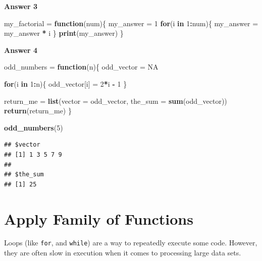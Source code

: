 \documentclass[
]{book}
\newenvironment{Shaded}{\begin{snugshade}}{\end{snugshade}}
\newcommand{\ControlFlowTok}[1]{\textcolor[rgb]{0.13,0.29,0.53}{\textbf{#1}}}
\newcommand{\DataTypeTok}[1]{\textcolor[rgb]{0.13,0.29,0.53}{#1}}
\newcommand{\DecValTok}[1]{\textcolor[rgb]{0.00,0.00,0.81}{#1}}
\newcommand{\KeywordTok}[1]{\textcolor[rgb]{0.13,0.29,0.53}{\textbf{#1}}}
\newcommand{\NormalTok}[1]{#1}
\newcommand{\OperatorTok}[1]{\textcolor[rgb]{0.81,0.36,0.00}{\textbf{#1}}}
\newcommand{\OtherTok}[1]{\textcolor[rgb]{0.56,0.35,0.01}{#1}}
\newcommand{\StringTok}[1]{\textcolor[rgb]{0.31,0.60,0.02}{#1}}
\begin{document}
\textbf{Answer 3}

\begin{Shaded}
\begin{Highlighting}[]
\NormalTok{my_factorial =}\StringTok{ }\ControlFlowTok{function}\NormalTok{(num)\{}
\NormalTok{  my_answer =}\StringTok{ }\DecValTok{1}
  \ControlFlowTok{for}\NormalTok{(i }\ControlFlowTok{in} \DecValTok{1}\OperatorTok{:}\NormalTok{num)\{}
\NormalTok{    my_answer =}\StringTok{ }\NormalTok{my_answer }\OperatorTok{*}\StringTok{ }\NormalTok{i }
\NormalTok{  \}}
  \KeywordTok{print}\NormalTok{(my_answer)}
\NormalTok{\}}
\end{Highlighting}
\end{Shaded}

\textbf{Answer 4}

\begin{Shaded}
\begin{Highlighting}[]
\NormalTok{odd_numbers =}\StringTok{ }\ControlFlowTok{function}\NormalTok{(n)\{}
\NormalTok{    odd_vector =}\StringTok{ }\OtherTok{NA}
  
  \ControlFlowTok{for}\NormalTok{(i }\ControlFlowTok{in} \DecValTok{1}\OperatorTok{:}\NormalTok{n)\{}
\NormalTok{    odd_vector[i] =}\StringTok{ }\DecValTok{2}\OperatorTok{*}\NormalTok{i }\OperatorTok{-}\StringTok{ }\DecValTok{1}
\NormalTok{  \}}
    
\NormalTok{ return_me =}\StringTok{ }\KeywordTok{list}\NormalTok{(}\DataTypeTok{vector =}\NormalTok{ odd_vector, }
                  \DataTypeTok{the_sum =} \KeywordTok{sum}\NormalTok{(odd_vector))}
 \KeywordTok{return}\NormalTok{(return_me)}
\NormalTok{\}}

\KeywordTok{odd_numbers}\NormalTok{(}\DecValTok{5}\NormalTok{)}
\end{Highlighting}
\end{Shaded}

\begin{verbatim}
## $vector
## [1] 1 3 5 7 9
## 
## $the_sum
## [1] 25
\end{verbatim}

\hypertarget{apply-family-of-functions}{%
\chapter{Apply Family of Functions}\label{apply-family-of-functions}}

Loops (like \texttt{for}, and \texttt{while}) are a way to repeatedly execute some code. However, they are often slow in execution when it comes to processing large data sets.
\end{document}
